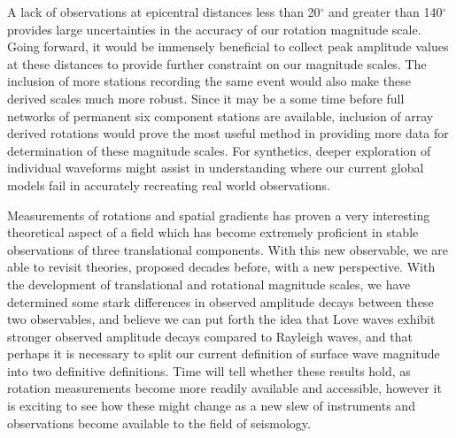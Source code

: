 \documentclass{gji}
\begin{document}
A lack of observations at epicentral distances less than 20$^\circ$ and greater than 140$^\circ$ provides large uncertainties in the accuracy of our rotation magnitude scale. Going forward, it would be immensely beneficial to collect peak amplitude values at these distances to provide further constraint on our magnitude scales. The inclusion of more stations recording the same event would also make these derived scales much more robust. Since it may be a some time before full networks of permanent six component stations are available, inclusion of array derived rotations would prove the most useful method in providing more data for determination of these magnitude scales. For synthetics, deeper exploration of individual waveforms might assist in understanding where our current global models fail in accurately recreating real world observations. 

Measurements of rotations and spatial gradients has proven a very interesting theoretical aspect of a field which has become extremely proficient in stable observations of three translational components. With this new observable, we are able to revisit theories, proposed decades before, with a new perspective. With the development of translational and rotational magnitude scales, we have determined some stark differences in observed amplitude decays between these two observables, and believe we can put forth the idea that Love waves exhibit stronger observed amplitude decays compared to Rayleigh waves, and that perhaps it is necessary to split our current definition of surface wave magnitude into two definitive definitions. Time will tell whether these results hold, as rotation measurements become more readily available and accessible, however it is exciting to see how these might change as a new slew of instruments and observations become available to the field of seismology. 
\end{document}
